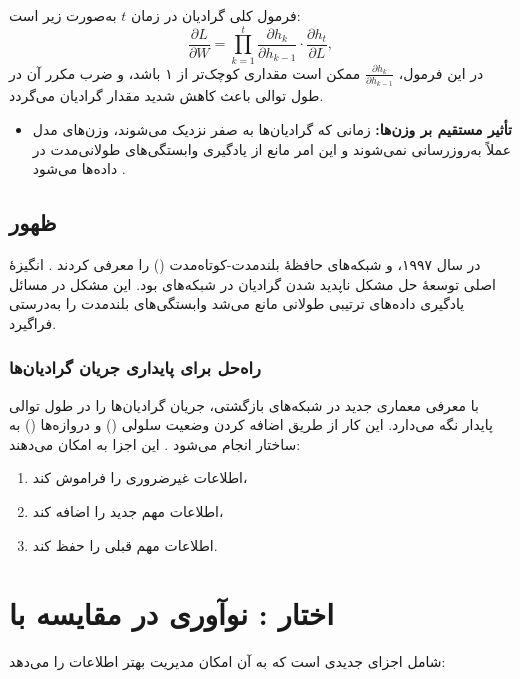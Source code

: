 فرمول کلی گرادیان در زمان \( t \) به‌صورت زیر است:
\[
\frac{\partial L}{\partial W} = \prod_{k=1}^{t} \frac{\partial h_k}{\partial h_{k-1}} \cdot \frac{\partial h_t}{\partial L},
\]
در این فرمول، \( \frac{\partial h_k}{\partial h_{k-1}} \) ممکن است مقداری کوچک‌تر از ۱ باشد، و ضرب مکرر آن در طول توالی باعث کاهش شدید مقدار گرادیان می‌گردد.

\begin{itemize}
	\item \textbf{تأثیر مستقیم بر وزن‌ها:}
	زمانی که گرادیان‌ها به صفر نزدیک می‌شوند، وزن‌های مدل عملاً به‌روزرسانی نمی‌شوند و این امر مانع از یادگیری وابستگی‌های طولانی‌مدت در داده‌ها می‌شود
	\cite{goodfellow2016deep}.
\end{itemize}

\subsection{ظهور }
در سال ۱۹۹۷،  و  شبکه‌های حافظهٔ بلندمدت-کوتاه‌مدت () را معرفی کردند
\cite{hochreiter1997long}.
انگیزهٔ اصلی توسعهٔ  حل مشکل ناپدید شدن گرادیان در شبکه‌های  بود. این مشکل در مسائل یادگیری داده‌های ترتیبی طولانی مانع می‌شد  وابستگی‌های بلندمدت را به‌درستی فراگیرد.

\subsubsection{راه‌حل  برای پایداری جریان گرادیان‌ها}
 با معرفی معماری جدید در شبکه‌های بازگشتی، جریان گرادیان‌ها را در طول توالی پایدار نگه می‌دارد. این کار از طریق اضافه کردن وضعیت سلولی () و دروازه‌ها () به ساختار  انجام می‌شود
\cite{gers1999learning}.
این اجزا به  امکان می‌دهند:

\begin{enumerate}
	\item اطلاعات غیرضروری را فراموش کند،
	\item اطلاعات مهم جدید را اضافه کند،
	\item اطلاعات مهم قبلی را حفظ کند.
\end{enumerate}

\section{اختار : نوآوری در مقایسه با }
 شامل اجزای جدیدی است که به آن امکان مدیریت بهتر اطلاعات را می‌دهد:

